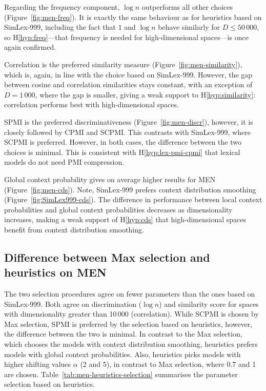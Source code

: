 Regarding the frequency component, $\log n$ outperforms all other choices (Figure~\ref{fig:men-freq}). It is exactly the same behaviour as for heuristics based on SimLex-999, including the fact that $1$ and $\log n$ behave similarly for $D \leq 50\,000$, so H\ref{hyp:freq}---that frequency is needed for high-dimensional spaces---is once again confirmed.




Correlation is the preferred similarity measure (Figure~\ref{fig:men-similarity}), which is, again, in line with the choice based on SimLex-999. However, the gap between cosine and correlation similarities stays constant, with an exception of $D = 1\,000$, where the gap is smaller, giving a weak support to H\ref{hyp:similarity}: correlation performs best with high-dimensional spaces.

SPMI is the preferred discriminativeness (Figure~\ref{fig:men-discr}), however, it is closely followed by CPMI and SCPMI. This contrasts with SimLex-999, where SCPMI is preferred. However, in both cases, the difference between the two choices is minimal. This is consistent with H\ref{hyp:lex-pmi-cpmi} that lexical models do not need PMI compression.


Global context probability gives on average higher results for MEN (Figure~\ref{fig:men-cds}). Note, SimLex-999 prefers context distribution smoothing (Figure~\ref{fig:SimLex999-cds}). The difference in performance between local context probabilities and global context probabilities decreases as dimensionality increases, making a weak support of H\ref{hyp:cds} that high-dimensional spaces benefit from context distribution smoothing.

\subsection{Difference between Max selection and heuristics on MEN}

The two selection procedures agree on fewer parameters than the ones based on SimLex-999. Both agree on discrimination ($\log n$) and similarity score for spaces with dimensionality greater than 10\,000 (correlation). While SCPMI is chosen by Max selection, SPMI is preferred by the selection based on heuristics, however, the difference between the two is minimal. In contrast to the Max selection, which chooses the models with context distribution smoothing, heuristics prefers models with global context probabilities. Also, heuristics picks models with higher shifting values $\alpha$ (2 and 5), in contrast to Max selection, where 0.7 and 1 are chosen. Table~\ref{tab:men-heuristics-selection} summarises the parameter selection based on heuristics.

